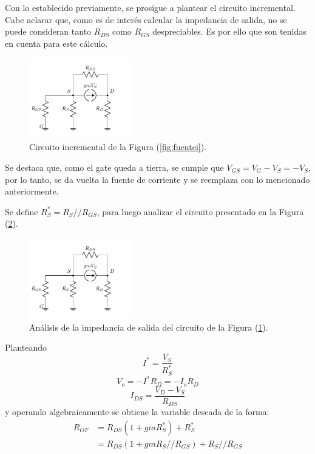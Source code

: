 Con lo establecido previamente, se prosigue a plantear el circuito incremental. Cabe aclarar que, como es de interés calcular la impedancia de salida, no se puede consideran tanto $R_{DS}$ como $R_{GS}$ despreciables. Es por ello que son tenidas en cuenta para este cálculo.
\begin{figure}[H]
\centering
	\includegraphics[width=0.4\textwidth, page=1]{Imagenes/ModeloIncremental.pdf}
	\caption{Circuito incremental de la Figura (\ref{fig:fuentei}).}
\label{fig:incfuente1}
\end{figure}

Se destaca que, como el gate queda a tierra, se cumple que $V_{GS} = V_G - V_S = - V_S$, por lo tanto, se da vuelta la fuente de corriente y se reemplaza con lo mencionado anteriormente. 

Se define $R_S^* = R_S // R_{GS}$, para luego analizar el circuito presentado en la Figura (\ref{fig:incfuente2}).
\begin{figure}[H]
\centering
\hspace*{2cm}
	\includegraphics[width=0.4\textwidth, page=2]{Imagenes/ModeloIncremental.pdf}
	\caption{Análisis de la impedancia de salida del circuito de la Figura (\ref{fig:incfuente1}).}
\label{fig:incfuente2}
\end{figure}

Planteando
\begin{equation*}
	I^* = \frac{V_S}{R_S^*}
\end{equation*}
\begin{equation*}
	V_o = -I^* R_D = -I_o R_D
\end{equation*}
\begin{equation*}
	I_{DS} = \frac{V_D - V_S}{R_{DS}}
\end{equation*}
y operando algebraicamente se obtiene la variable deseada de la forma:
\begin{equation}
\begin{split}
	R_{OF} & = R_{DS} \left( 1 + gm R_S^* \right) + R_S^* \\
		   & = R_{DS} \left( 1 + gm R_S//R_{GS} \right) + R_S//R_{GS}
\end{split}
\end{equation}

